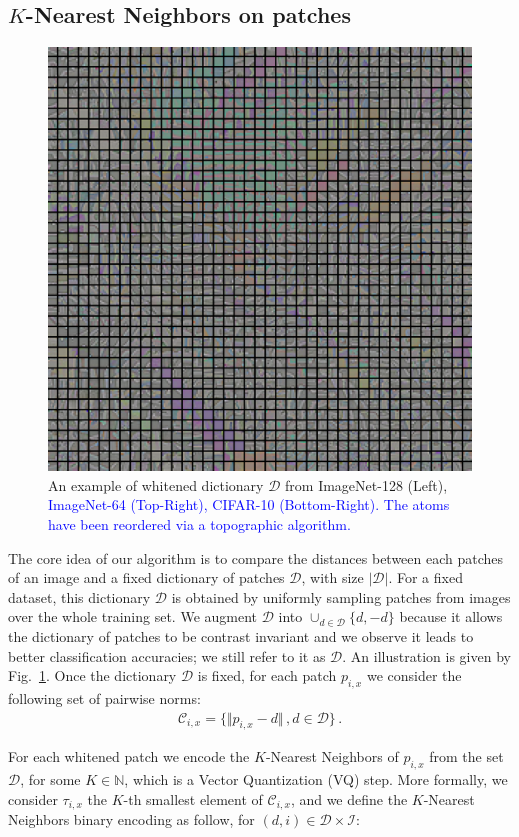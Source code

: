 \documentclass{article}
\newcommand{\Edouard}[1]{\textcolor{blue}{#1}}
\begin{document}
\subsection{$K$-Nearest Neighbors on patches}
\begin{figure}
  
  	\includegraphics[width=0.5\linewidth]{figures/topographical_order_more_patches}
  \caption{An example of whitened dictionary  $\mathcal{D}$ from ImageNet-128 (Left), \Edouard{ ImageNet-64 (Top-Right), CIFAR-10 (Bottom-Right). The atoms have been reordered via a topographic algorithm.\label{dico}}}
\end{figure}
The core idea of our algorithm is to compare the distances between each patches of an image and a fixed dictionary of patches $\mathcal{D}$, with size $|\mathcal{D}|$.
For a fixed dataset, this dictionary $\mathcal{D}$ is obtained by uniformly sampling patches from images over the whole training set. We augment $\mathcal{D}$ into $\cup_{d\in \mathcal{D}}\{d,-d\}$ because it allows the dictionary of patches to be contrast invariant and we observe it leads to better classification accuracies; we still refer to it as $\mathcal{D}$. An illustration is given by Fig.~\ref{dico}. Once the dictionary $\mathcal{D}$ is fixed, for each patch $p_{i,x}$ we consider the following set of  pairwise norms:
\begin{align}\mathcal{C}_{i, x} =\{\Vert p_{i, x} - d \Vert\,, d\in\mathcal{D} \}\,.\end{align}
 
For each whitened patch we encode the $K$-Nearest Neighbors of $p_{i,x}$ from the set $\mathcal{D}$, for some $ K \in \mathbb{N}$, which is a Vector Quantization (VQ) step.
More formally, we consider $\tau_{i,x}$ the $K$-th smallest  element of $\mathcal{C}_{i,x}$, and we define the $K$-Nearest Neighbors binary encoding as follow, for $(d,i)\in\mathcal{D}\times\mathcal{I}$:
\end{document}
